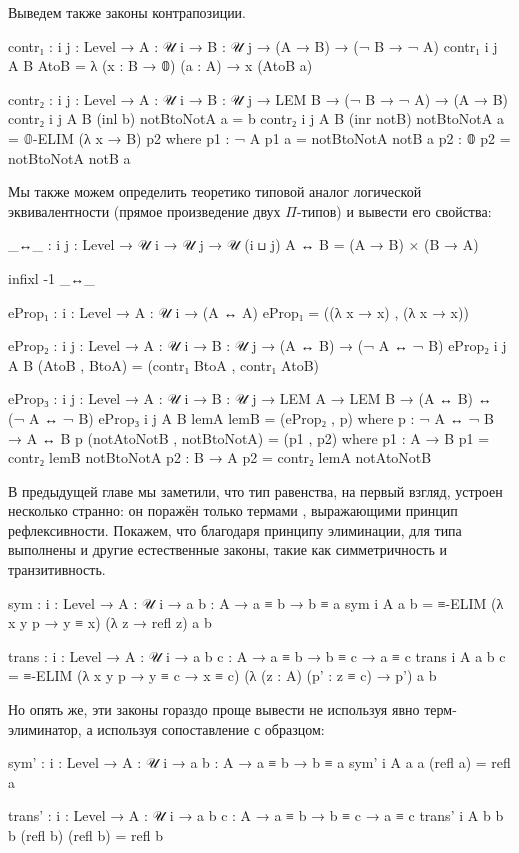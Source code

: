 \documentclass{article}[12pt]
\begin{document}
Выведем также законы контрапозиции.
\begin{code}
contr₁ : {i j : Level} → {A : 𝒰 i} → {B : 𝒰 j}
         → (A → B) → (¬ B → ¬ A)
contr₁ {i} {j} {A} {B} AtoB = λ (x : B → 𝟘) (a : A) → x (AtoB a)

contr₂ : {i j : Level} → {A : 𝒰 i} → {B : 𝒰 j}
         → LEM B
         → (¬ B → ¬ A) → (A → B)
contr₂ {i} {j} {A} {B} (inl b) notBtoNotA a = b
contr₂ {i} {j} {A} {B} (inr notB) notBtoNotA a = 𝟘-ELIM (λ x → B) p2
    where
        p1 : ¬ A
        p1 a = notBtoNotA notB a
        p2 : 𝟘
        p2 = notBtoNotA notB a
\end{code}

Мы также можем определить теоретико типовой аналог логической эквивалентности
(прямое произведение двух $\Pi$-типов) и вывести его свойства:
\begin{code}
_↔_ : {i j : Level} → 𝒰 i → 𝒰 j → 𝒰 (i ⊔ j)
A ↔ B = (A → B) × (B → A)

infixl -1 _↔_

eProp₁ : {i : Level} → {A : 𝒰 i} → (A ↔ A)
eProp₁ = ((λ x → x) , (λ x → x))

eProp₂ : {i j : Level} → {A : 𝒰 i} → {B : 𝒰 j}
         → (A ↔ B) → (¬ A ↔ ¬ B)
eProp₂ {i} {j} {A} {B} (AtoB , BtoA) = (contr₁ BtoA , contr₁ AtoB)

eProp₃ : {i j : Level} → {A : 𝒰 i} → {B : 𝒰 j}
         → LEM A → LEM B
         → (A ↔ B) ↔ (¬ A ↔ ¬ B)
eProp₃ {i} {j} {A} {B} lemA lemB = (eProp₂ , p)
    where
        p : ¬ A ↔ ¬ B → A ↔ B
        p (notAtoNotB , notBtoNotA) = (p1 , p2)
            where
                p1 : A → B
                p1 = contr₂ lemB notBtoNotA
                p2 : B → A
                p2 = contr₂ lemA notAtoNotB
\end{code}

В предыдущей главе мы заметили, что тип равенства, на первый взгляд, устроен несколько странно:
он поражён только термами , выражающими принцип рефлексивности.
Покажем, что благодаря принципу элиминации, для типа  выполнены и другие
естественные законы, такие как симметричность и транзитивность.
\begin{code}
sym : {i : Level} → {A : 𝒰 i} → {a b : A} → a ≡ b → b ≡ a
sym {i} {A} {a} {b} = ≡-ELIM (λ x y p → y ≡ x) (λ z → refl z) a b

trans : {i : Level} → {A : 𝒰 i} → {a b c : A}
        → a ≡ b → b ≡ c → a ≡ c
trans {i} {A} {a} {b} {c} = ≡-ELIM (λ x y p → y ≡ c → x ≡ c) 
                                   (λ (z : A) (p' : z ≡ c) → p') a b
\end{code}
Но опять же, эти законы гораздо проще вывести не используя явно терм-элиминатор,
а используя сопоставление с образцом:
\begin{code}
sym' : {i : Level} → {A : 𝒰 i} → {a b : A} → a ≡ b → b ≡ a
sym' {i} {A} {a} {a} (refl a) = refl a

trans' : {i : Level} → {A : 𝒰 i} → {a b c : A}
        → a ≡ b → b ≡ c → a ≡ c
trans' {i} {A} {b} {b} {b} (refl b) (refl b) = refl b
\end{code}
\end{document}
